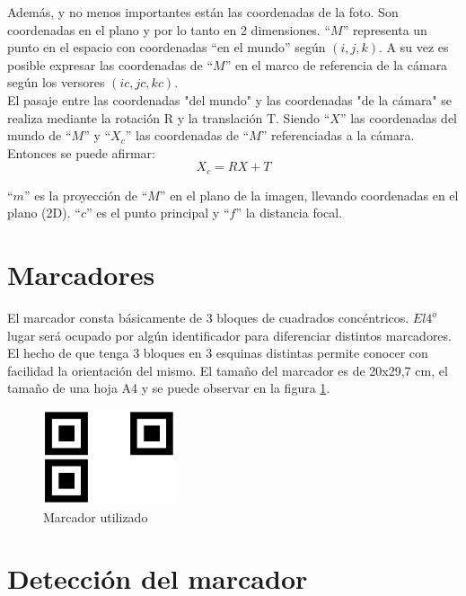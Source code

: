 Además, y no menos importantes están las coordenadas de la foto. Son coordenadas en el plano y por lo tanto en 2 dimensiones. ``$M$'' representa un punto en el espacio con coordenadas ``en el mundo'' según $(i,j,k)$. A su vez es posible expresar las coordenadas de ``$M$'' en el marco de referencia de la cámara según los versores $(ic,jc,kc)$.\\

El pasaje entre las coordenadas "del mundo" y las coordenadas "de la cámara" se realiza mediante la rotación R y la translación T.
Siendo ``$X$'' las coordenadas del mundo de ``$M$'' y ``$X_c$'' las coordenadas de ``$M$'' referenciadas a la cámara. Entonces se puede afirmar:
$$X_c = R X + T$$

``$m$'' es la proyección de ``$M$'' en el plano de la imagen, llevando coordenadas en el plano (2D). ``$c$'' es el punto principal y ``$f$'' la distancia focal.

\section{Marcadores}

El marcador consta básicamente de 3 bloques de cuadrados concéntricos. $El 4^o$ lugar será ocupado por algún identificador para diferenciar distintos marcadores. El hecho de que tenga 3 bloques en 3 esquinas distintas permite conocer con facilidad la orientación del mismo. El tamaño del marcador es de 20x29,7 cm, el tamaño de una hoja A4 y se puede observar en la figura \ref{fig:marcador}.

\begin{figure}
	\begin{center}
		\includegraphics[width=0.35\textwidth]{./pics_camara/marcador.jpg}
	\end{center}
	\caption{Marcador utilizado}
	\label{fig:marcador}
\end{figure}

\section{Detección del marcador}

